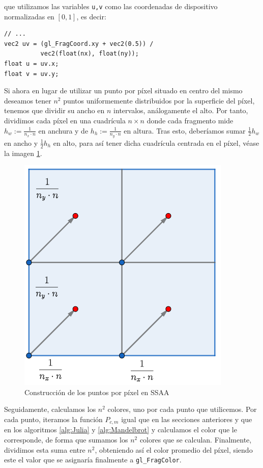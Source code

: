 que utilizamos las variables \verb|u,v| como las coordenadas de dispositivo normalizadas en $[0,1]$, es decir:

\begin{lstlisting}
// ... 
vec2 uv = (gl_FragCoord.xy + vec2(0.5)) / 
          vec2(float(nx), float(ny));
float u = uv.x;
float v = uv.y;
\end{lstlisting}

Si ahora en lugar de utilizar un punto por píxel situado en centro del mismo deseamos tener $n^2$ puntos uniformemente distribuidos por la superficie del píxel, tenemos que dividir su ancho en $n$ intervalos, análogamente el alto. Por tanto, dividimos cada píxel en una cuadrícula $n\times n$ donde cada fragmento mide $h_w:=\frac{1}{n_x\cdot n}$ en anchura y de $h_h:=\frac{1}{n_y\cdot n}$ en altura. Tras esto, deberíamos sumar $\frac{1}{2}h_w$ en ancho y $\frac{1}{2}h_h$ en alto, para así tener dicha cuadrícula centrada en el píxel, véase la imagen \ref{fig:SSAA}.

\begin{figure} [ht]
  \centering
  \includegraphics[scale = 0.45]{img/C7/SSAA.png}
  \caption{Construcción de los puntos por píxel en SSAA}
  \label{fig:SSAA}
\end{figure}

Seguidamente, calculamos los $n^2$ colores, uno por cada punto que utilicemos. Por cada punto, iteramos la función $P_{c,m}$ igual que en las secciones anteriores y que en los algoritmos \ref{alg:Julia} y \ref{alg:Mandelbrot} y calculamos el color que le corresponde, de forma que sumamos los $n^2$ colores que se calculan.  Finalmente, dividimos esta suma entre $n^2$, obteniendo así el color promedio del píxel, siendo este el valor que se asignaría finalmente a \verb|gl_FragColor|.


